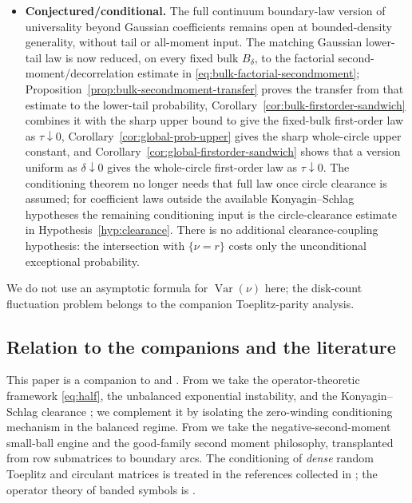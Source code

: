 \documentclass[11pt]{amsart}
\numberwithin{equation}{section}
\theoremstyle{definition}
\theoremstyle{remark}
\newcommand{\T}{\mathbb T}
\newcommand{\Var}{\operatorname{Var}}
\newcommand{\abs}[1]{\left\lvert #1\right\rvert}
\begin{document}
\begin{itemize}
The same natural-speed scale holds for stratified one-point-per-cell random
grids and random shifts of a uniform lattice, without the iid coupon-collector
overhead (Corollary~\ref{cor:stratified-grid-detects}).
Under bounded density it also gives the tail-free polynomial separation
\(\min_{\T}\abs{G_m}>m^{-A}\) with exceptional probability
\(O_{A,K}(m^{-2(A-1)/3})\) for every \(A>1\)
(Corollary~\ref{cor:variance-boundary-separation}).
\item \textbf{Conjectured/conditional.} The full continuum boundary-law version of universality beyond Gaussian coefficients remains open at bounded-density generality, without tail or all-moment input. The matching Gaussian lower-tail law is now reduced, on every fixed bulk \(B_\delta\), to the factorial second-moment/decorrelation estimate in \eqref{eq:bulk-factorial-secondmoment}; Proposition~\ref{prop:bulk-secondmoment-transfer} proves the transfer from that estimate to the lower-tail probability, Corollary~\ref{cor:bulk-firstorder-sandwich} combines it with the sharp upper bound to give the fixed-bulk first-order law as \(\tau\downarrow0\), Corollary~\ref{cor:global-prob-upper} gives the sharp whole-circle upper constant, and Corollary~\ref{cor:global-firstorder-sandwich} shows that a version uniform as \(\delta\downarrow0\) gives the whole-circle first-order law as \(\tau\downarrow0\). The conditioning theorem no longer needs that full law once circle clearance is assumed; for coefficient laws outside the available Konyagin--Schlag hypotheses the remaining conditioning input is the circle-clearance estimate in Hypothesis~\ref{hyp:clearance}. There is no additional clearance-coupling hypothesis: the intersection with \(\{\nu=r\}\) costs only the unconditional exceptional probability.
\end{itemize}
We do not use an asymptotic formula for $\Var(\nu)$ here; the disk-count fluctuation problem belongs to the companion Toeplitz-parity analysis.

\subsection*{Relation to the companions and the literature}
This paper is a companion to \cite{Parity} and \cite{PhaseRetrieval}. From \cite{Parity} we take the operator-theoretic framework \eqref{eq:half}, the unbalanced exponential instability, and the Konyagin--Schlag clearance \cite{KMS}; we complement it by isolating the zero-winding conditioning mechanism in the balanced regime. From \cite{PhaseRetrieval} we take the negative-second-moment small-ball engine and the good-family second moment philosophy, transplanted from row submatrices to boundary arcs. The conditioning of \emph{dense} random Toeplitz and circulant matrices is treated in the references collected in \cite{Parity}; the operator theory of banded symbols is \cite{BG}.
\end{document}

